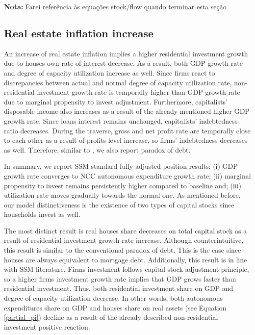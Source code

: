 \documentclass[11pt]{article}
\begin{document}
\textbf{Nota:} Farei referência às equações stock/flow quando terminar esta seção

\subsection{Real estate inflation increase}
\label{sec:org220407d}
\label{sec:Exp2}


An increase of real estate inflation implies a higher residential investment growth due to houses own rate of interest decrease.
As a result, both GDP growth rate and degree of capacity utilization increase as well.
Since firms react to discrepancies between actual and normal degree of capacity utilization rate, non-residential investment growth rate 
is temporally higher than GDP growth rate due to marginal propensity to invest adjustment.
Furthermore, capitalists' disposable income also increases as a result of the already mentioned higher GDP growth rate.
Since loans interest remains unchanged, capitalists' indebtedness ratio decreases.
During the traverse, gross and net profit rate are temporally close to each other as a result of profits level increase, so firms' indebtedness decreases as well.
Therefore, similar to \textcite{mandarino-2020-worker-debt}, we also report paradox of debt.

In summary, we report SSM standard fully-adjusted position results:
    (i) GDP growth rate converges to NCC autonomous expenditure growth rate;
    (ii) marginal propensity to invest remains persistently higher compared to baseline and;
    (iii) utilization rate moves gradually towards the normal one.
As mentioned before, our model distinctiveness is the existence of two types of capital stocks since households invest as well.


The most distinct result is real houses share decreases on total capital stock as a result of residential investment growth rate increase.
Although counterintuitive, this result is similar to the conventional paradox of debt.
This is the case since houses are always equivalent to  mortgage debt.
Additionally, this result is in line with SSM literature.
Firms investment follows capital stock adjustment principle, so a higher firms investment growth rate implies that
GDP grows faster than residential investment.
Thus, both residential investment share on GDP and degree of capacity  utilization decrease.
In other words, both autonomous expenditures share on GDP and houses share on real assets (see Equation \ref{partial_pi}) decline as a result of the already described non-residential investment positive reaction.
\end{document}
